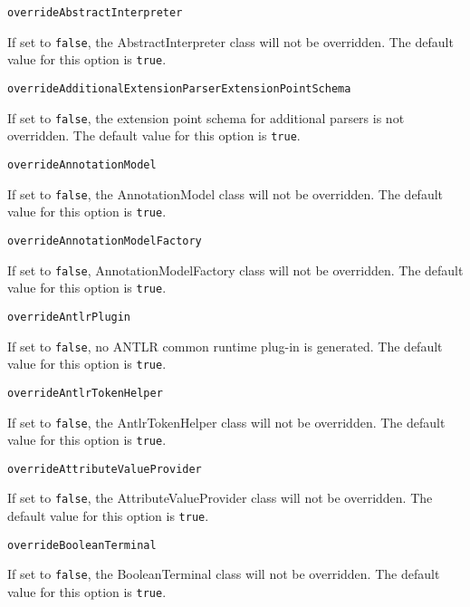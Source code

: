 \noindent\texttt{overrideAbstractInterpreter}
\begin{myindentpar}{1cm}
If set to \texttt{false}, the AbstractInterpreter class will not be overridden. The default value for this option is \texttt{true}.
\end{myindentpar}

\noindent\texttt{overrideAdditionalExtensionParserExtensionPointSchema}
\begin{myindentpar}{1cm}
If set to \texttt{false}, the extension point schema for additional parsers is not overridden. The default value for this option is \texttt{true}.
\end{myindentpar}

\noindent\texttt{overrideAnnotationModel}
\begin{myindentpar}{1cm}
If set to \texttt{false}, the AnnotationModel class will not be overridden. The default value for this option is \texttt{true}.
\end{myindentpar}

\noindent\texttt{overrideAnnotationModelFactory}
\begin{myindentpar}{1cm}
If set to \texttt{false}, AnnotationModelFactory class will not be overridden. The default value for this option is \texttt{true}.
\end{myindentpar}

\noindent\texttt{overrideAntlrPlugin}
\begin{myindentpar}{1cm}
If set to \texttt{false}, no ANTLR common runtime plug-in is generated. The default value for this option is \texttt{true}.
\end{myindentpar}

\noindent\texttt{overrideAntlrTokenHelper}
\begin{myindentpar}{1cm}
If set to \texttt{false}, the AntlrTokenHelper class will not be overridden. The default value for this option is \texttt{true}.
\end{myindentpar}

\noindent\texttt{overrideAttributeValueProvider}
\begin{myindentpar}{1cm}
If set to \texttt{false}, the AttributeValueProvider class will not be overridden. The default value for this option is \texttt{true}.
\end{myindentpar}

\noindent\texttt{overrideBooleanTerminal}
\begin{myindentpar}{1cm}
If set to \texttt{false}, the BooleanTerminal class will not be overridden. The default value for this option is \texttt{true}.
\end{myindentpar}

